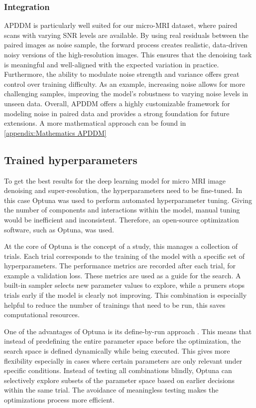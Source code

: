 \documentclass[twocolumn]{article}
\begin{document}
\subsubsection{Integration}
APDDM is particularly well suited for our micro-MRI dataset, where paired scans with varying SNR levels are available. 
By using real residuals between the paired images as noise sample, the forward process creates realistic, data-driven noisy versions of the high-resolution images. 
This ensures that the denoising task is meaningful and well-aligned with the expected variation in practice. 
Furthermore, the ability to modulate noise strength and variance offers great control over training difficulty. 
As an example, increasing noise allows for more challenging samples, improving the model's robustness to varying noise levels in unseen data. 
Overall, APDDM offers a highly customizable framework for modeling noise in paired data and provides a strong foundation for future extensions. 
A more mathematical approach can be found in \ref{appendix:Mathematics APDDM}

\subsection{Trained hyperparameters}

To get the best results for the deep learning model for micro MRI image denoising and super-resolution, the hyperparameters need to be fine-tuned. 
In this case Optuna was used to perform automated hyperparameter tuning. 
Giving the number of components and interactions within the model, manual tuning would be inefficient and inconsistent. 
Therefore, an open-source optimization software, such as Optuna, was used. 

At the core of Optuna is the concept of a study, this manages a collection of trials. 
Each trial corresponds to the training of the model with a specific set of hyperparameters. 
The performance metrics are recorded after each trial, for example a validation loss. These metrics are used as a guide for the search. 
A built-in sampler selects new parameter values to explore, while a pruners stops trials early if the model is clearly not improving. 
This combination is especially helpful to reduce the number of trainings that need to be run, this saves computational resources. 

One of the advantages of Optuna is its define-by-run approach \cite{10.1145/3292500.3330701}. 
This means that instead of predefining the entire parameter space before the optimization, the search space is defined dynamically while being executed. 
This gives more flexibility especially in cases where certain parameters are only relevant under specific conditions. 
Instead of testing all combinations blindly, Optuna can selectively explore subsets of the parameter space based on earlier decisions within the same trial. 
The avoidance of meaningless testing makes the optimizations process  more efficient. 
\end{document}

